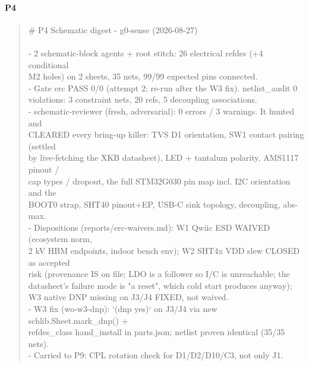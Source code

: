 \documentclass[11pt,a4paper]{article}
\begin{document}
\paragraph*{P4}
\begin{quote}\small\ttfamily\raggedright
\# P4 Schematic digest - g0-sense (2026-08-27)\\
~\\
- 2 schematic-block agents + root stitch: 26 electrical refdes (+4 conditional\\
  M2 holes) on 2 sheets, 35 nets, 99/99 expected pins connected.\\
- Gate erc PASS 0/0 (attempt 2; re-run after the W3 fix). netlist\_audit 0\\
  violations: 3 constraint nets, 20 refs, 5 decoupling associations.\\
- schematic-reviewer (fresh, adversarial): 0 errors / 3 warnings. It hunted and\\
  CLEARED every bring-up killer: TVS D1 orientation, SW1 contact pairing (settled\\
  by live-fetching the XKB datasheet), LED + tantalum polarity, AMS1117 pinout /\\
  cap types / dropout, the full STM32G030 pin map incl. I2C orientation and the\\
  BOOT0 strap, SHT40 pinout+EP, USB-C sink topology, decoupling, abs-max.\\
- Dispositions (reports/erc-waivers.md): W1 Qwiic ESD WAIVED (ecosystem norm,\\
  2 kV HBM endpoints, indoor bench env); W2 SHT4x VDD slew CLOSED as accepted\\
  risk (provenance IS on file; LDO is a follower so I/C is unreachable; the\\
  datasheet's failure mode is "a reset", which cold start produces anyway);\\
  W3 native DNP missing on J3/J4 FIXED, not waived.\\
- W3 fix (wo-w3-dnp): `(dnp yes)` on J3/J4 via new schlib.Sheet.mark\_dnp() +\\
  refdes\_class hand\_install in parts.json; netlist proven identical (35/35 nets).\\
- Carried to P9: CPL rotation check for D1/D2/D10/C3, not only J1.
\end{quote}
\end{document}
